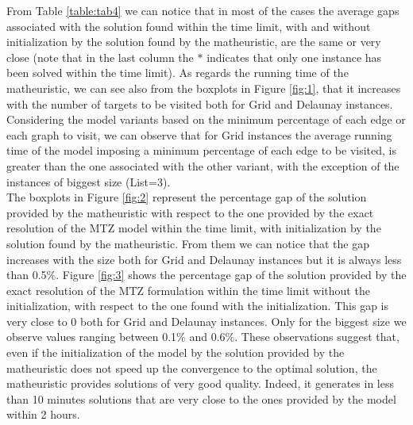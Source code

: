 \noindent
From Table \ref{table:tab4} we can notice that in most of the cases the average gaps associated with the solution found within the time limit, with and without initialization by the solution found by the matheuristic, are the same or very close (note that in the last column the $*$ indicates that only one instance has been solved within the time limit).
As regards the running time of the matheuristic, we can see also from the boxplots in Figure \ref{fig:1}, that it increases with the number of targets to be visited both for Grid and Delaunay instances. Considering the model variants based on the minimum percentage of each edge or each graph to visit, we can observe that for Grid instances the average running time of the model imposing a minimum percentage of each edge to be visited, is greater than the one associated with the other variant, with the exception of the instances of biggest size (List=3). \\
\noindent
The boxplots in Figure \ref{fig:2} represent the percentage gap of the solution provided by the matheuristic with respect to the one provided by the exact resolution of the MTZ model within the time limit, with initialization by the solution found by the matheuristic. From them we can notice that the gap increases with the size both for Grid and Delaunay instances but it is always less than 0.5$\%$.  
Figure \ref{fig:3} shows the percentage gap of the solution provided by the exact resolution of the MTZ formulation within the time limit without the initialization, with respect to the one found with the initialization. This gap is very close to 0 both for Grid and Delaunay instances. Only for the biggest size we observe values ranging between 0.1$\%$ and 0.6$\%$. These observations suggest that, even if the initialization of the model by the solution provided by the matheuristic does not speed up the convergence to the optimal solution, the matheuristic provides solutions of very good quality. Indeed, it generates in less than 10 minutes solutions that are very close to the ones provided by the model within 2 hours.\\


